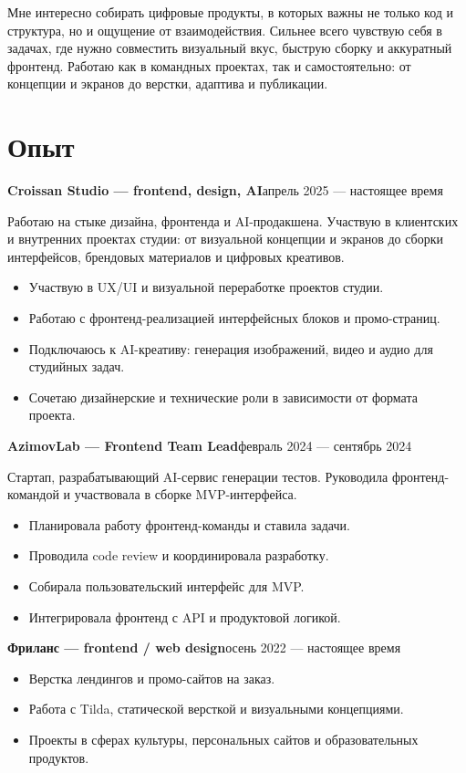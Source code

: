\documentclass[11pt,a4paper]{article}
\newcommand{\roleline}[2]{
  \textbf{#1}\hfill\textcolor{dategray}{\normalfont #2}
}
\begin{document}
Мне интересно собирать цифровые продукты, в которых важны не только код и структура, но и ощущение от взаимодействия. Сильнее всего чувствую себя в задачах, где нужно совместить визуальный вкус, быструю сборку и аккуратный фронтенд. Работаю как в командных проектах, так и самостоятельно: от концепции и экранов до верстки, адаптива и публикации.

\section*{Опыт}

\roleline{Croissan Studio — frontend, design, AI}{апрель 2025 --- настоящее время}

Работаю на стыке дизайна, фронтенда и AI-продакшена. Участвую в клиентских и внутренних проектах студии: от визуальной концепции и экранов до сборки интерфейсов, брендовых материалов и цифровых креативов.

\begin{itemize}
  \item Участвую в UX/UI и визуальной переработке проектов студии.
  \item Работаю с фронтенд-реализацией интерфейсных блоков и промо-страниц.
  \item Подключаюсь к AI-креативу: генерация изображений, видео и аудио для студийных задач.
  \item Сочетаю дизайнерские и технические роли в зависимости от формата проекта.
\end{itemize}

\roleline{AzimovLab — Frontend Team Lead}{февраль 2024 --- сентябрь 2024}

Стартап, разрабатывающий AI-сервис генерации тестов. Руководила фронтенд-командой и участвовала в сборке MVP-интерфейса.

\begin{itemize}
  \item Планировала работу фронтенд-команды и ставила задачи.
  \item Проводила code review и координировала разработку.
  \item Собирала пользовательский интерфейс для MVP.
  \item Интегрировала фронтенд с API и продуктовой логикой.
\end{itemize}

\roleline{Фриланс — frontend / web design}{осень 2022 --- настоящее время}

\begin{itemize}
  \item Верстка лендингов и промо-сайтов на заказ.
  \item Работа с Tilda, статической версткой и визуальными концепциями.
  \item Проекты в сферах культуры, персональных сайтов и образовательных продуктов.
\end{itemize}
\end{document}
